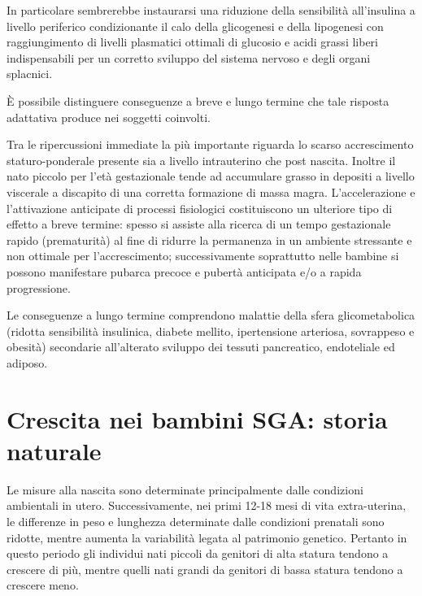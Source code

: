 In particolare sembrerebbe instaurarsi una riduzione della sensibilità all'insulina
a livello periferico condizionante il calo della glicogenesi e della lipogenesi
con raggiungimento di livelli plasmatici ottimali di glucosio e acidi grassi liberi
indispensabili per un corretto sviluppo del sistema nervoso e degli organi splacnici.\cite{sga-51}



\`E possibile distinguere conseguenze a breve e lungo termine che tale risposta
adattativa produce nei soggetti coinvolti.

Tra le ripercussioni immediate la più importante riguarda lo scarso accrescimento
staturo-ponderale presente sia a livello intrauterino che post nascita. Inoltre 
il nato piccolo per l'età gestazionale tende ad accumulare grasso in depositi a livello
viscerale a discapito di una corretta formazione di massa magra. L'accelerazione e 
l'attivazione anticipate di processi fisiologici costituiscono un ulteriore tipo di 
effetto a breve termine: spesso si assiste alla ricerca di un tempo gestazionale
rapido (prematurità) al fine di ridurre la permanenza in un ambiente stressante
e non ottimale per l'accrescimento\cite{sga-53}; successivamente soprattutto nelle bambine si possono manifestare pubarca precoce e pubertà anticipata e/o a rapida progressione. 

Le conseguenze a lungo termine comprendono malattie della sfera glicometabolica (ridotta sensibilità insulinica, diabete mellito,
ipertensione arteriosa, sovrappeso e obesità) secondarie all'alterato sviluppo dei tessuti pancreatico, endoteliale ed adiposo.\cite{sga-32}


\section{Crescita nei bambini SGA: storia naturale}

Le misure alla nascita sono determinate principalmente dalle condizioni ambientali in utero. Successivamente, nei primi 12-18 mesi di vita extra-uterina, le differenze in peso e lunghezza determinate dalle condizioni prenatali sono ridotte, mentre aumenta la variabilità legata al patrimonio genetico. Pertanto in questo periodo gli individui nati piccoli da genitori di alta statura tendono a crescere di più, mentre quelli nati grandi da genitori di bassa statura tendono a crescere meno. 


